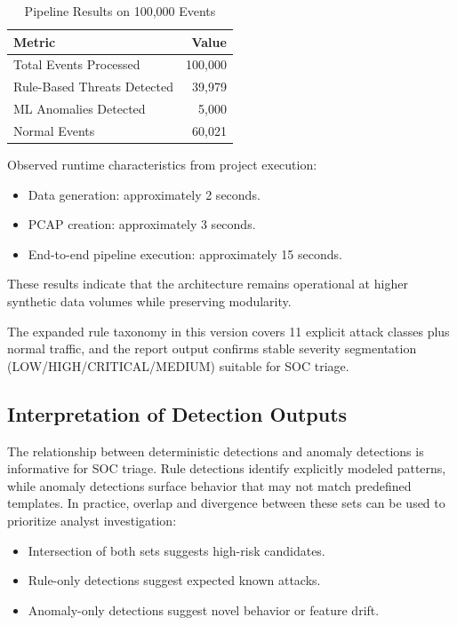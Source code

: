 \documentclass[conference]{IEEEtran}
\begin{document}
\begin{table}[h]
\centering
\caption{Pipeline Results on 100,000 Events}
\label{tab:results}
\begin{tabular}{lr}
\toprule
Metric & Value \\
\midrule
Total Events Processed & 100,000 \\
Rule-Based Threats Detected & 39,979 \\
ML Anomalies Detected & 5,000 \\
Normal Events & 60,021 \\
\bottomrule
\end{tabular}
\end{table}

Observed runtime characteristics from project execution:
\begin{itemize}
    \item Data generation: approximately 2 seconds.
    \item PCAP creation: approximately 3 seconds.
    \item End-to-end pipeline execution: approximately 15 seconds.
\end{itemize}

These results indicate that the architecture remains operational at higher synthetic data volumes while preserving modularity.

The expanded rule taxonomy in this version covers 11 explicit attack classes plus normal traffic, and the report output confirms stable severity segmentation (LOW/HIGH/CRITICAL/MEDIUM) suitable for SOC triage.

\subsection{Interpretation of Detection Outputs}
The relationship between deterministic detections and anomaly detections is informative for SOC triage. Rule detections identify explicitly modeled patterns, while anomaly detections surface behavior that may not match predefined templates. In practice, overlap and divergence between these sets can be used to prioritize analyst investigation:
\begin{itemize}
    \item Intersection of both sets suggests high-risk candidates.
    \item Rule-only detections suggest expected known attacks.
    \item Anomaly-only detections suggest novel behavior or feature drift.
\end{itemize}
\end{document}
